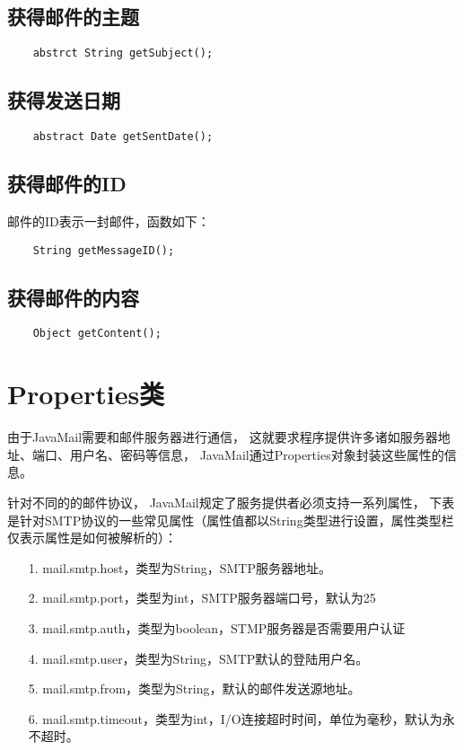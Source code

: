 \documentclass[a4paper,left=2.5cm,right=2.5cm,11pt]{article}
\begin{document}
\subsection{获得邮件的主题}
	\begin{lstlisting}
	abstrct String getSubject();
	\end{lstlisting}

\subsection{获得发送日期}
	\begin{lstlisting}
	abstract Date getSentDate();
	\end{lstlisting}

\subsection{获得邮件的ID}
	邮件的ID表示一封邮件，函数如下：
	\begin{lstlisting}
	String getMessageID();
	\end{lstlisting}

\subsection{获得邮件的内容}
	\begin{lstlisting}
	Object getContent();
	\end{lstlisting}

\section{Properties类}
	由于JavaMail需要和邮件服务器进行通信，
	这就要求程序提供许多诸如服务器地址、端口、用户名、密码等信息，
	JavaMail通过Properties对象封装这些属性的信息。\par

	针对不同的的邮件协议，
	JavaMail规定了服务提供者必须支持一系列属性，
	下表是针对SMTP协议的一些常见属性（属性值都以String类型进行设置，属性类型栏仅表示属性是如何被解析的）：\par

	\begin{itemize}
		\item[1.] mail.smtp.host，类型为String，SMTP服务器地址。
		\item[2.] mail.smtp.port，类型为int，SMTP服务器端口号，默认为25
		\item[3.] mail.smtp.auth，类型为boolean，STMP服务器是否需要用户认证
		\item[4.] mail.smtp.user，类型为String，SMTP默认的登陆用户名。
		\item[5.] mail.smtp.from，类型为String，默认的邮件发送源地址。
		\item[6.] mail.smtp.timeout，类型为int，I/O连接超时时间，单位为毫秒，默认为永不超时。
	\end{itemize}
\end{document}
